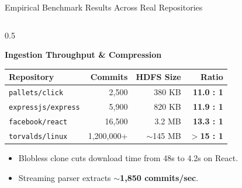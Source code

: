 \documentclass[aspectratio=169, 10pt]{beamer}
\begin{document}
\begin{frame}{Empirical Benchmark Results Across Real Repositories}
  \begin{columns}[T]
    \begin{column}{0.5\textwidth}
      \begin{block}{\textbf{Ingestion Throughput \& Compression}}
        \centering
        \scriptsize
        \begin{tabular}{l r r r}
          \toprule
          \textbf{Repository} & \textbf{Commits} & \textbf{HDFS Size} & \textbf{Ratio} \\
          \midrule
          \texttt{pallets/click} & 2,500 & 380 KB & \textbf{11.0 : 1} \\
          \texttt{expressjs/express} & 5,900 & 820 KB & \textbf{11.9 : 1} \\
          \texttt{facebook/react} & 16,500 & 3.2 MB & \textbf{13.3 : 1} \\
          \texttt{torvalds/linux} & 1,200,000+ & $\sim$145 MB & \textbf{$>$15 : 1} \\
          \bottomrule
        \end{tabular}
        \vspace{0.1cm}
        \begin{itemize}
          \item Blobless clone cuts download time from 48s to 4.2s on React.
          \item Streaming parser extracts $\sim$\textbf{1,850 commits/sec}.
        \end{itemize}
      \end{block}
    \end{column}


\end{columns}
\end{frame}
\end{document}
